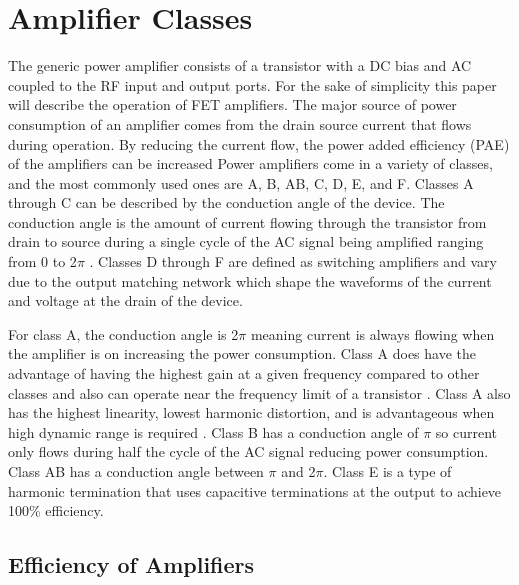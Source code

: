 \chapter{Amplifier Classes}
The generic power amplifier consists of a transistor with a DC bias and AC coupled to the RF input and output ports. For the sake of simplicity this paper will describe the operation of FET amplifiers. The major source of power consumption of an amplifier comes from the drain source current that flows during operation. By reducing the current flow, the power added efficiency (PAE) of the amplifiers can be increased
Power amplifiers come in a variety of classes, and the most commonly used ones are A, B, AB, C, D, E, and F. Classes A through C can be described by the conduction angle of the device. The conduction angle is the amount of current flowing through the transistor from drain to source during a single cycle of the AC signal being amplified ranging from 0 to 2$\pi$ \cite{Colantonio1998}. Classes D through F are defined as switching amplifiers and vary due to the output matching network which shape the waveforms of the current and voltage at the drain of the device.

For class A, the conduction angle is 2$\pi$ meaning current is always flowing when the amplifier is on increasing the power consumption. Class A does have the advantage of having the highest gain at a given frequency compared to other classes and also can operate near the frequency limit of a transistor .\cite{} Class A also has the highest linearity, lowest harmonic distortion, and is advantageous when high dynamic range is required .\cite{C.Cripps2006} Class B has a conduction angle of $\pi$ so current only flows during half the cycle of the AC signal reducing power consumption. Class AB has a conduction angle between $\pi$ and 2$\pi$. Class E is a type of harmonic termination that uses capacitive terminations at the output to achieve 100\% efficiency.


\section{Efficiency of Amplifiers}

